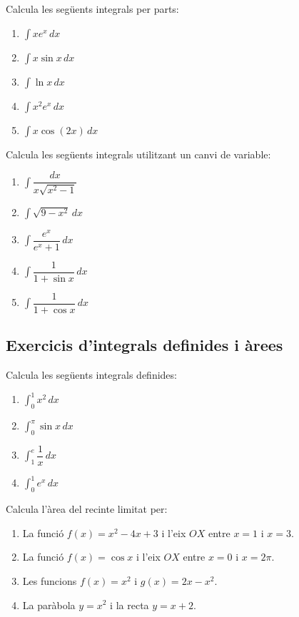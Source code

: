 \documentclass[12pt]{article}
\begin{document}
\begin{exercici}
Calcula les següents integrals per parts:
\begin{enumerate}
    \item $\displaystyle \int x e^x\,dx$
    \item $\displaystyle \int x \sin x\,dx$
    \item $\displaystyle \int \ln x\,dx$
    \item $\displaystyle \int x^2 e^x\,dx$
    \item $\displaystyle \int x \cos(2x)\,dx$
\end{enumerate}
\end{exercici}

\begin{exercici}
Calcula les següents integrals utilitzant un canvi de variable:
\begin{enumerate}
    \item $\displaystyle \int \dfrac{dx}{x\sqrt{x^2-1}}$
    \item $\displaystyle \int \sqrt{9-x^2}\,dx$
    \item $\displaystyle \int \dfrac{e^x}{e^x+1}\,dx$
    \item $\displaystyle \int \dfrac{1}{1+\sin x}\,dx$
    \item $\displaystyle \int \dfrac{1}{1+\cos x}\,dx$
\end{enumerate}
\end{exercici}

\subsection{Exercicis d'integrals definides i àrees}

\begin{exercici}
Calcula les següents integrals definides:
\begin{enumerate}
    \item $\displaystyle \int_0^1 x^2\,dx$
    \item $\displaystyle \int_0^\pi \sin x\,dx$
    \item $\displaystyle \int_1^e \dfrac{1}{x}\,dx$
    \item $\displaystyle \int_0^1 e^x\,dx$
\end{enumerate}
\end{exercici}

\begin{exercici}
Calcula l'àrea del recinte limitat per:
\begin{enumerate}
    \item La funció $f(x)=x^2-4x+3$ i l'eix $OX$ entre $x=1$ i $x=3$.
    \item La funció $f(x)=\cos x$ i l'eix $OX$ entre $x=0$ i $x=2\pi$.
    \item Les funcions $f(x)=x^2$ i $g(x)=2x-x^2$.
    \item La paràbola $y=x^2$ i la recta $y=x+2$.
\end{enumerate}
\end{exercici}
\end{document}
